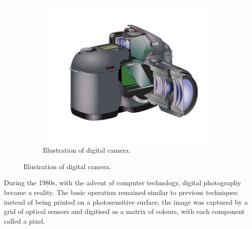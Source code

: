 \begin{toReview}
\begin{figure}[ht]
\begin{subfigure}[t]{0.4\linewidth}
        \includegraphics[width=\linewidth]{Figures/digitalcamera.png}
        \caption{Illustration of digital camera\cite{Reflex}.}
    \end{subfigure}
\end{figure}

\noindent During the 1980s, with the advent of computer technology, digital photography became a reality. The basic operation remained similar to previous techniques: instead of being printed on a photosensitive surface, the image was captured by a grid of optical sensors and digitised as a matrix of colours, with each component called a pixel.


\end{toReview}

